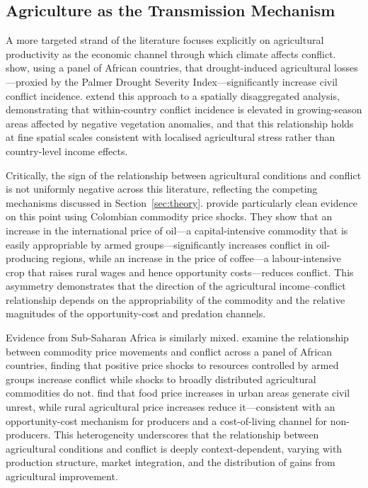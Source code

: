 \subsection{Agriculture as the Transmission Mechanism}

A more targeted strand of the literature focuses explicitly on agricultural productivity as the economic channel through which climate affects conflict. \citet{CoutteynierSoubeyran2014} show, using a panel of African countries, that drought-induced agricultural losses---proxied by the Palmer Drought Severity Index---significantly increase civil conflict incidence. \citet{HarariLaFerrara2018} extend this approach to a spatially disaggregated analysis, demonstrating that within-country conflict incidence is elevated in growing-season areas affected by negative vegetation anomalies, and that this relationship holds at fine spatial scales consistent with localised agricultural stress rather than country-level income effects.

Critically, the sign of the relationship between agricultural conditions and conflict is not uniformly negative across this literature, reflecting the competing mechanisms discussed in Section~\ref{sec:theory}. \citet{DubeVargas2013} provide particularly clean evidence on this point using Colombian commodity price shocks. They show that an increase in the international price of oil---a capital-intensive commodity that is easily appropriable by armed groups---significantly increases conflict in oil-producing regions, while an increase in the price of coffee---a labour-intensive crop that raises rural wages and hence opportunity costs---reduces conflict. This asymmetry demonstrates that the direction of the agricultural income--conflict relationship depends on the appropriability of the commodity and the relative magnitudes of the opportunity-cost and predation channels.

Evidence from Sub-Saharan Africa is similarly mixed. \citet{Berman_etal2017} examine the relationship between commodity price movements and conflict across a panel of African countries, finding that positive price shocks to resources controlled by armed groups increase conflict while shocks to broadly distributed agricultural commodities do not. \citet{AldrichSarr2020} find that food price increases in urban areas generate civil unrest, while rural agricultural price increases reduce it---consistent with an opportunity-cost mechanism for producers and a cost-of-living channel for non-producers. This heterogeneity underscores that the relationship between agricultural conditions and conflict is deeply context-dependent, varying with production structure, market integration, and the distribution of gains from agricultural improvement.

